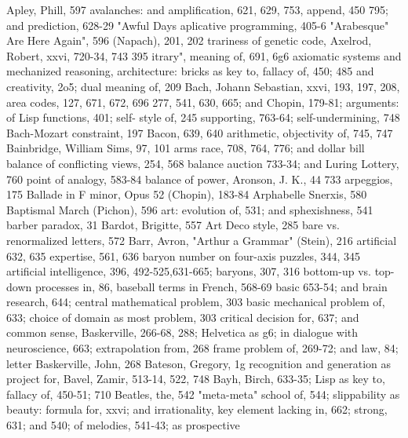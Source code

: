 Apley, Phill, 597                                  avalanches: and amplification, 621, 629, 753,
append, 450                                         795; and prediction, 628-29 "Awful Days
aplicative programming, 405-6 "Arabesque"           Are Here Again", 596
 (Napach), 201, 202 trariness of genetic code,     Axelrod, Robert, xxvi, 720-34, 743
 395 itrary", meaning of, 691, 6g6                 axiomatic systems and mechanized reasoning,
architecture: bricks as key to, fallacy of, 450;    485
 and creativity, 2o5; dual meaning of, 209         Bach, Johann Sebastian, xxvi, 193, 197, 208,
area codes, 127, 671, 672, 696                      277, 541, 630, 665; and Chopin, 179-81;
arguments: of Lisp functions, 401; self-            style of, 245
 supporting, 763-64; self-undermining, 748         Bach-Mozart constraint, 197 Bacon, 639, 640
arithmetic, objectivity of, 745, 747               Bainbridge, William Sims, 97, 101
arms race, 708, 764, 776; and dollar bill          balance of conflicting views, 254, 568 balance
 auction 733-34; and Luring Lottery, 760            point of analogy, 583-84 balance of power,
Aronson, J. K., 44                                  733
arpeggios, 175                                     Ballade in F minor, Opus 52 (Chopin), 183-84
Arphabelle Snerxis, 580                            Baptismal March (Pichon), 596
art: evolution of, 531; and sphexishness, 541      barber paradox, 31 Bardot, Brigitte, 557
 Art Deco style, 285                               bare vs. renormalized letters, 572 Barr, Avron,
"Arthur a Grammar" (Stein), 216 artificial          632, 635
 expertise, 561, 636                               baryon number on four-axis puzzles, 344, 345
artificial intelligence, 396, 492-525,631-665;      baryons, 307, 316
 bottom-up vs. top-down processes in, 86,          baseball terms in French, 568-69 basic
 653-54; and brain research, 644; central           mathematical problem, 303 basic mechanical
 problem of, 633; choice of domain as most          problem, 303
 critical decision for, 637; and common sense,     Baskerville, 266-68, 288; Helvetica as
 g6; in dialogue with neuroscience, 663;            extrapolation from, 268
 frame problem of, 269-72; and law, 84; letter     Baskerville, John, 268 Bateson, Gregory, 1g
 recognition and generation as project for,        Bavel, Zamir, 513-14, 522, 748 Bayh, Birch,
 633-35; Lisp as key to, fallacy of, 450-51;        710 Beatles, the, 542
 "meta-meta" school of, 544; slippability as       beauty: formula for, xxvi; and irrationality,
 key element lacking in, 662; strong, 631; and      540; of melodies, 541-43; as prospective
